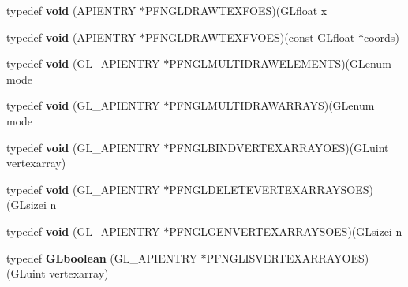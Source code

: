 \begin{DoxyCompactItemize}
\item 
\hypertarget{class_c_p_v_r_tgles_ext_a69e4c956988f0202a6e2756d8143d6e9}{typedef {\bfseries void} (A\+P\+I\+E\+N\+T\+R\+Y $\ast$P\+F\+N\+G\+L\+D\+R\+A\+W\+T\+E\+X\+F\+O\+E\+S)(G\+Lfloat x}\label{class_c_p_v_r_tgles_ext_a69e4c956988f0202a6e2756d8143d6e9}

\item 
\hypertarget{class_c_p_v_r_tgles_ext_a07550afc086fbd64c1f20784104bb19a}{typedef {\bfseries void} (A\+P\+I\+E\+N\+T\+R\+Y $\ast$P\+F\+N\+G\+L\+D\+R\+A\+W\+T\+E\+X\+F\+V\+O\+E\+S)(const G\+Lfloat $\ast$coords)}\label{class_c_p_v_r_tgles_ext_a07550afc086fbd64c1f20784104bb19a}

\item 
\hypertarget{class_c_p_v_r_tgles_ext_a9afc1902042045a20a3b24f9bf8c1a72}{typedef {\bfseries void} (G\+L\+\_\+\+A\+P\+I\+E\+N\+T\+R\+Y $\ast$P\+F\+N\+G\+L\+M\+U\+L\+T\+I\+D\+R\+A\+W\+E\+L\+E\+M\+E\+N\+T\+S)(G\+Lenum mode}\label{class_c_p_v_r_tgles_ext_a9afc1902042045a20a3b24f9bf8c1a72}

\item 
\hypertarget{class_c_p_v_r_tgles_ext_a472a5c2c525598de26cfa59fcfbfe12d}{typedef {\bfseries void} (G\+L\+\_\+\+A\+P\+I\+E\+N\+T\+R\+Y $\ast$P\+F\+N\+G\+L\+M\+U\+L\+T\+I\+D\+R\+A\+W\+A\+R\+R\+A\+Y\+S)(G\+Lenum mode}\label{class_c_p_v_r_tgles_ext_a472a5c2c525598de26cfa59fcfbfe12d}

\item 
\hypertarget{class_c_p_v_r_tgles_ext_a8333ce0dfdfaa5169a4a0b02ed06a0b1}{typedef {\bfseries void} (G\+L\+\_\+\+A\+P\+I\+E\+N\+T\+R\+Y $\ast$P\+F\+N\+G\+L\+B\+I\+N\+D\+V\+E\+R\+T\+E\+X\+A\+R\+R\+A\+Y\+O\+E\+S)(G\+Luint vertexarray)}\label{class_c_p_v_r_tgles_ext_a8333ce0dfdfaa5169a4a0b02ed06a0b1}

\item 
\hypertarget{class_c_p_v_r_tgles_ext_a3f9f5243a8aa8b796009b9ed1259f545}{typedef {\bfseries void} (G\+L\+\_\+\+A\+P\+I\+E\+N\+T\+R\+Y $\ast$P\+F\+N\+G\+L\+D\+E\+L\+E\+T\+E\+V\+E\+R\+T\+E\+X\+A\+R\+R\+A\+Y\+S\+O\+E\+S)(G\+Lsizei n}\label{class_c_p_v_r_tgles_ext_a3f9f5243a8aa8b796009b9ed1259f545}

\item 
\hypertarget{class_c_p_v_r_tgles_ext_af29d6be0cce1ee73fcd560093e79157b}{typedef {\bfseries void} (G\+L\+\_\+\+A\+P\+I\+E\+N\+T\+R\+Y $\ast$P\+F\+N\+G\+L\+G\+E\+N\+V\+E\+R\+T\+E\+X\+A\+R\+R\+A\+Y\+S\+O\+E\+S)(G\+Lsizei n}\label{class_c_p_v_r_tgles_ext_af29d6be0cce1ee73fcd560093e79157b}

\item 
\hypertarget{class_c_p_v_r_tgles_ext_a0b219974056443272b254f2ac1283a0b}{typedef {\bfseries G\+Lboolean} (G\+L\+\_\+\+A\+P\+I\+E\+N\+T\+R\+Y $\ast$P\+F\+N\+G\+L\+I\+S\+V\+E\+R\+T\+E\+X\+A\+R\+R\+A\+Y\+O\+E\+S)(G\+Luint vertexarray)}\label{class_c_p_v_r_tgles_ext_a0b219974056443272b254f2ac1283a0b}


\end{DoxyCompactItemize}
